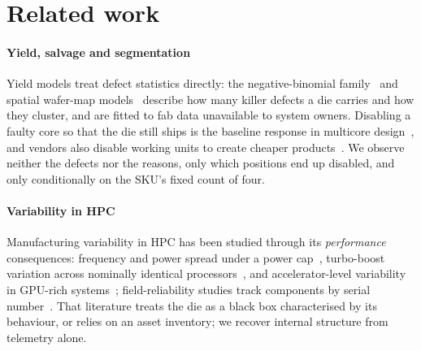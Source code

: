 \documentclass[10pt,conference]{IEEEtran}
\begin{document}
\section{Related work}
\paragraph*{Yield, salvage and segmentation} Yield models treat defect statistics directly: the
negative-binomial family~\cite{koren1993negbinom} and spatial wafer-map
models~\cite{bae2007waferyield} describe how many killer defects a die carries and how they
cluster, and are fitted to fab data unavailable to system owners. Disabling a faulty core so that
the die still ships is the baseline response in multicore design~\cite{shivakumar2003redundancy,powell2009salvaging},
and vendors also disable working units to create cheaper products~\cite{deneckere1996damaged,mccalpin2021knl}. We
observe neither the defects nor the reasons, only which positions end up disabled, and only
conditionally on the SKU's fixed count of four.

\paragraph*{Variability in HPC} Manufacturing variability in HPC has been studied through its
\emph{performance} consequences: frequency and power spread under a power
cap~\cite{inadomi2015variation}, turbo-boost variation across nominally identical
processors~\cite{acun2016variation}, and accelerator-level variability in GPU-rich
systems~\cite{sinha2022gpuvariability}; field-reliability studies track components by serial
number~\cite{ostrouchov2020titan}. That literature treats the die as a black box characterised by
its behaviour, or relies on an asset inventory; we recover internal structure from telemetry alone.
\end{document}
